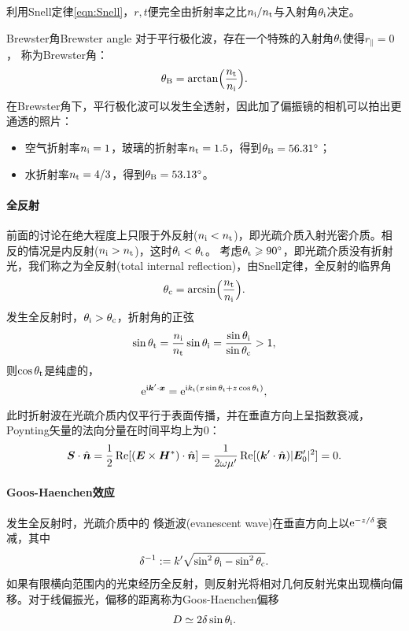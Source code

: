 利用Snell定律\eqref{eqn:Snell}，$r,t$便完全由折射率之比$n_{\mathrm{i}}/n_\text t$与入射角$\theta_{\mathrm{i}}$决定。

\begin{example}
    {Brewster角}{Brewster angle}
    对于平行极化波，存在一个特殊的入射角$\theta_{\mathrm{i}}$使得$r_\parallel=0$，%
    称为Brewster角：
    \begin{equation}
        \label{eqn:Brewster}
        \theta_\text B=\arctan\Bigl(\frac{n_\text t}{n_{\mathrm{i}}}\Bigr).
    \end{equation}
    在Brewster角下，平行极化波可以发生全透射，因此加了偏振镜的相机可以拍出更通透的照片：
    \begin{itemize}
        \item 空气折射率$n_{\mathrm{i}}=1$，玻璃的折射率$n_\text t=1.5$，得到$\theta_\text B=56.31^\circ$；
        \item 水折射率$n_\text t=4/3$，得到$\theta_\text B=53.13^\circ$。
    \end{itemize}
    
\end{example}
\paragraph{全反射}
前面的讨论在绝大程度上只限于外反射($n_{\mathrm{i}}<n_\text t$)，即光疏介质入射光密介质。相反的情况是内反射($n_{\mathrm{i}}>n_\text t$)，这时$\theta_{\mathrm{i}}<\theta_\text t$。
考虑$\theta_\text t\geqslant90^\circ$，即光疏介质没有折射光，我们称之为全反射(total internal reflection)，由Snell定律，全反射的临界角
\begin{equation}
    \label{eqn:total reflect}
    \theta_\text c=\arcsin\Bigl(\frac{n_\text t}{n_{\mathrm{i}}}\Bigr).
\end{equation}
发生全反射时，$\theta_{\mathrm{i}}>\theta_\text c$，折射角的正弦
\[
    \sin\theta_\text t=\frac{n_{\mathrm{i}}}{n_\text t}\sin\theta_{\mathrm{i}}=\frac{\sin\theta_{\mathrm{i}}}{\sin\theta_\text c}>1,
\]
则$\cos\theta_\text t$是纯虚的，
\[
    \mathop{}\!\mathrm{e}^{\mathrm{i}\bm k'\cdot\bm x}=\mathop{}\!\mathrm{e}^{\mathrm{i} k_\text t(x\sin\theta_\text t+z\cos\theta_\text t)},
\]
此时折射波在光疏介质内仅平行于表面传播，并在垂直方向上呈指数衰减，Poynting矢量的法向分量在时间平均上为0：
\[
    \bm S\cdot\mathop{}\!\hat{\bm{n}}=\frac12\operatorname{Re}[(\bm E\times\bm H^\ast)\cdot\mathop{}\!\hat{\bm{n}}]=\frac1{2\omega\mu'}\operatorname{Re}[(\bm k'\cdot\mathop{}\!\hat{\bm{n}})|\bm E'_0|^2]=0.
\]
\paragraph{Goos-Haenchen效应}
发生全反射时，光疏介质中的
倏逝波(evanescent wave)在垂直方向上以$\mathop{}\!\mathrm{e}^{-z/\delta}$衰减，其中
\[
    \delta^{-1}:=k'\sqrt{\sin^2\theta_{\mathrm{i}}-\sin^2\theta_\text c}.
\]
如果有限横向范围内的光束经历全反射，则反射光将相对几何反射光束出现横向偏移。对于线偏振光，偏移的距离称为Goos-Haenchen偏移
\[
    D\simeq 2\delta\sin\theta_{\mathrm{i}}.
\]

